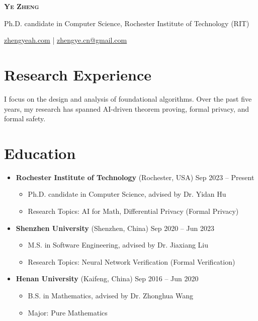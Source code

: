 \documentclass[a4paper,11pt]{article}
\newcommand{\topicon}[1]{\raisebox{0.01em}{\resizebox{!}{0.7em}{#1}}}
\newcommand{\headerfontiii}{\fontfamily{ppl}\selectfont} %
\begin{document}
\headerfontiii

\begin{center}
    {\Huge\textbf{\scshape Ye Zheng}}
\end{center}
\vspace{-3mm}

\begin{center}
  \small{Ph.D. candidate in Computer Science, Rochester Institute of Technology (RIT)}
\end{center}
\vspace{-6mm}
\begin{center}
    \small{\topicon{\faGlobe} \href{https://zhengyeah.com}{zhengyeah.com} | 
    \topicon{\faMailBulk} \href{mailto:zhengye.cn@gmail.com}{zhengye.cn@gmail.com}}
\end{center}

\section{\textbf{Research Experience}}

I focus on the design and analysis of foundational algorithms. 
Over the past five years, my research has spanned AI-driven theorem proving, formal privacy, and formal safety.

\section{\textbf{Education}}

\begin{itemize}[leftmargin=0pt,label={}]
    \item \textbf{Rochester Institute of Technology}{ \scriptsize (Rochester, USA)} \hfill Sep 2023 -- Present\vspace{-0.5em}    
    \begin{itemize}
      \item Ph.D. candidate in Computer Science, advised by Dr. Yidan Hu
      \item Research Topics: AI for Math, Differential Privacy (Formal Privacy)
    \end{itemize}
    \item \textbf{Shenzhen University}{ \scriptsize (Shenzhen, China)} \hfill Sep 2020 -- Jun 2023\vspace{-0.5em}
    \begin{itemize}
      \item M.S. in Software Engineering, advised by Dr. Jiaxiang Liu
      \item Research Topics: Neural Network Verification (Formal Verification)
    \end{itemize}
    \item \textbf{Henan University}{ \scriptsize (Kaifeng, China)} \hfill Sep 2016 -- Jun 2020\vspace{-0.5em}
    \begin{itemize}
      \item B.S. in Mathematics, advised by Dr. Zhonghua Wang
      \item Major: Pure Mathematics
    \end{itemize}
\end{itemize}
\end{document}
